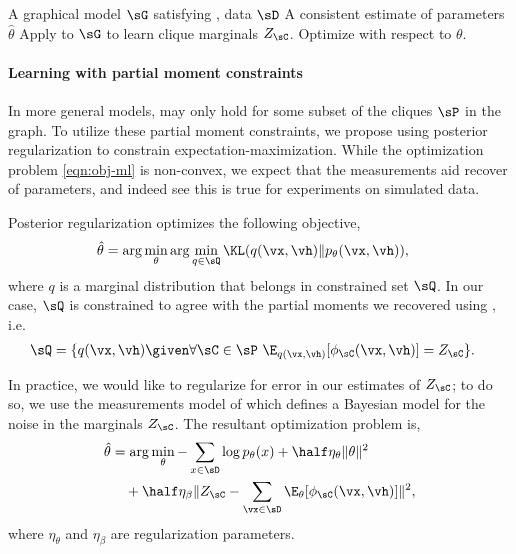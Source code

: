 \renewcommand{\algorithmicrequire}{\textbf{Input:}}
\renewcommand{\algorithmicensure}{\textbf{Output:}}
\begin{algorithm}
  \caption{\LearnLogLinear}
  \label{algo:undirected}
  \begin{algorithmic}
    \REQUIRE A graphical model $\sG$ satisfying , data $\sD$
    \ENSURE A consistent estimate of parameters $\hat \theta$
      \STATE Apply \LearnMarginals to $\sG$ to learn clique marginals $Z_\sC$.
      \STATE Optimize  with respect to $\theta$.
  \end{algorithmic}
\end{algorithm}

\paragraph{Learning with partial moment constraints}

In more general models,  may only hold for
  some subset of the cliques $\sP$ in the graph.
To utilize these partial moment constraints, we propose using posterior
  regularization \citep{graca08em} to constrain expectation-maximization.
While the optimization problem \eqref{eqn:obj-ml} is non-convex, we
  expect that the measurements aid recover of parameters, and indeed see
  this is true for experiments on simulated data.

Posterior regularization optimizes the following objective,
\begin{align*}
  \hat \theta &= \arg\min_{\theta} \arg\min_{q \in \sQ} \KL( q(\vx,\vh) \| p_{\theta}(\vx, \vh) ),
\end{align*}
where $q$ is a marginal distribution that belongs in constrained set
$\sQ$. In our case, $\sQ$ is constrained to agree with the partial
moments we recovered using \LearnMarginals, i.e. 
\begin{align*}
  \sQ &= \{ q(\vx,\vh) \given \forall \sC \in \sP ~ \E_{q(\vx,\vh)}[\phi_\sC(\vx, \vh)] = Z_\sC \}.
\end{align*}

In practice, we would like to regularize for error in our
  estimates of $Z_\sC$; to do so, we use the measurements model of
  \citet{liang09measurements} which defines a Bayesian model for the noise
  in the marginals $Z_\sC$. The resultant optimization problem is,
\begin{align*}
  \hat\theta 
  &= \arg\min_\theta - \sum_{x \in \sD} \log p_\theta(x) + \half \eta_\theta \| \theta \|^2 \\
  &\quad + \half \eta_\beta \| Z_\sC - \sum_{\vx \in \sD} \E_{\theta}[\phi_\sC(\vx,\vh)] \|^2,
\end{align*}
where $\eta_\theta$ and $\eta_\beta$ are regularization parameters. 

